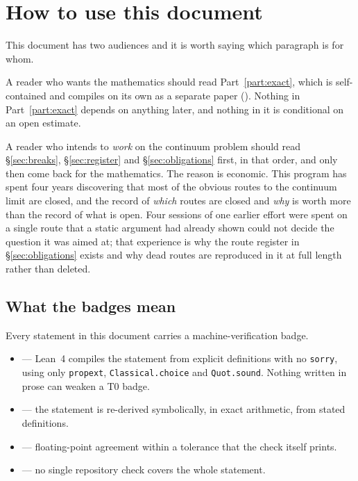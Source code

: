 \section{How to use this document}
\label{sec:howto}

This document has two audiences and it is worth saying which paragraph is
for whom.

A reader who wants the mathematics should read Part~\ref{part:exact},
which is self-contained and compiles on its own as a separate paper
(). Nothing in
Part~\ref{part:exact} depends on anything later, and nothing in it is
conditional on an open estimate.

A reader who intends to \emph{work} on the continuum problem should read
\S\ref{sec:breaks}, \S\ref{sec:register} and \S\ref{sec:obligations}
first, in that order, and only then come back for the mathematics. The
reason is economic. This program has spent four years discovering that
most of the obvious routes to the continuum limit are closed, and the
record of \emph{which} routes are closed and \emph{why} is worth more
than the record of what is open. Four sessions of one earlier effort were
spent on a single route that a static argument had already shown could
not decide the question it was aimed at; that experience is why the
route register in \S\ref{sec:obligations} exists and why dead routes are
reproduced in it at full length rather than deleted.

\subsection{What the badges mean}

Every statement in this document carries a machine-verification badge.

\begin{itemize}
  \item \Tzero{} --- Lean~4 compiles the statement from explicit
    definitions with no \texttt{sorry}, using only \texttt{propext},
    \texttt{Classical.choice} and \texttt{Quot.sound}. Nothing written
    in prose can weaken a T0 badge.
  \item \Tone{} --- the statement is re-derived symbolically, in exact
    arithmetic, from stated definitions.
  \item \Ttwo{} --- floating-point agreement within a tolerance that the
    check itself prints.
  \item \Tthree{} --- no single repository check covers the whole
    statement.
\end{itemize}

